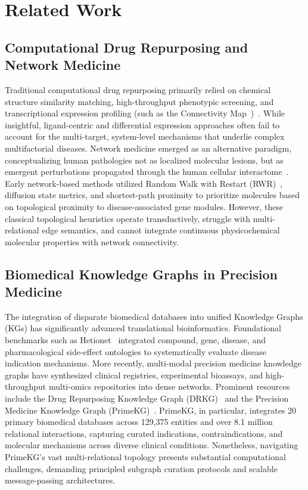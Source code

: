 \documentclass[conference,a4paper]{IEEEtran}
\begin{document}
\section{Related Work}

\subsection{Computational Drug Repurposing and Network Medicine}
Traditional computational drug repurposing primarily relied on chemical structure similarity matching, high-throughput phenotypic screening, and transcriptional expression profiling (such as the Connectivity Map~\cite{ref_cmap})~\cite{ref6,ref7}. While insightful, ligand-centric and differential expression approaches often fail to account for the multi-target, system-level mechanisms that underlie complex multifactorial diseases. Network medicine emerged as an alternative paradigm, conceptualizing human pathologies not as localized molecular lesions, but as emergent perturbations propagated through the human cellular interactome~\cite{ref3}. Early network-based methods utilized Random Walk with Restart (RWR)~\cite{ref_rwr}, diffusion state metrics, and shortest-path proximity to prioritize molecules based on topological proximity to disease-associated gene modules. However, these classical topological heuristics operate transductively, struggle with multi-relational edge semantics, and cannot integrate continuous physicochemical molecular properties with network connectivity.

\subsection{Biomedical Knowledge Graphs in Precision Medicine}
The integration of disparate biomedical databases into unified Knowledge Graphs (KGs) has significantly advanced translational bioinformatics. Foundational benchmarks such as Hetionet~\cite{ref_hetio} integrated compound, gene, disease, and pharmacological side-effect ontologies to systematically evaluate disease indication mechanisms. More recently, multi-modal precision medicine knowledge graphs have synthesized clinical registries, experimental bioassays, and high-throughput multi-omics repositories into dense networks. Prominent resources include the Drug Repurposing Knowledge Graph (DRKG)~\cite{ref_drkg} and the Precision Medicine Knowledge Graph (PrimeKG)~\cite{ref29}. PrimeKG, in particular, integrates 20 primary biomedical databases across 129,375 entities and over 8.1 million relational interactions, capturing curated indications, contraindications, and molecular mechanisms across diverse clinical conditions. Nonetheless, navigating PrimeKG's vast multi-relational topology presents substantial computational challenges, demanding principled subgraph curation protocols and scalable message-passing architectures.
\end{document}
